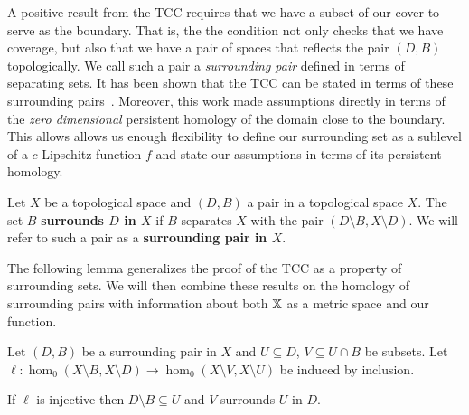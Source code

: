 

A positive result from the TCC requires that we have a subset of our cover to serve as the boundary.
That is, the the condition not only checks that we have coverage, but also that we have a pair of spaces that reflects the pair $(D, B)$ topologically.
We call such a pair a \emph{surrounding pair} defined in terms of separating sets.
It has been shown that the TCC can be stated in terms of these surrounding pairs~\cite{cavanna2017when}.
Moreover, this work made assumptions directly in terms of the \emph{zero dimensional} persistent homology of the domain close to the boundary.
This allows allows us enough flexibility to define our surrounding set as a sublevel of a $c$-Lipschitz function $f$ and state our assumptions in terms of its persistent homology.

\begin{definition}
  Let $X$ be a topological space and $(D,B)$ a pair in a topological space $X$.
  The set $B$ \textbf{surrounds $D$ in $X$} if $B$ separates $X$ with the pair $(D\setminus B, X\setminus D)$.
  We will refer to such a pair as a \textbf{surrounding pair in $X$}.
\end{definition}

The following lemma generalizes the proof of the TCC as a property of surrounding sets.%
We will then combine these results on the homology of surrounding pairs with information about both $\mathbb{X}$ as a metric space and our function.

\begin{lemma}\label{lem:coverage}
  Let $(D, B)$ be a surrounding pair in $X$ and $U\subseteq D$, $V\subseteq U\cap B$ be subsets.
  Let $\ell: \hom_0(X\setminus B, X\setminus D)\to \hom_0(X\setminus V, X\setminus U)$ be induced by inclusion.

  If $\ell$ is injective then $D\setminus B\subseteq U$ and $V$ surrounds $U$ in $D$.
\end{lemma}

